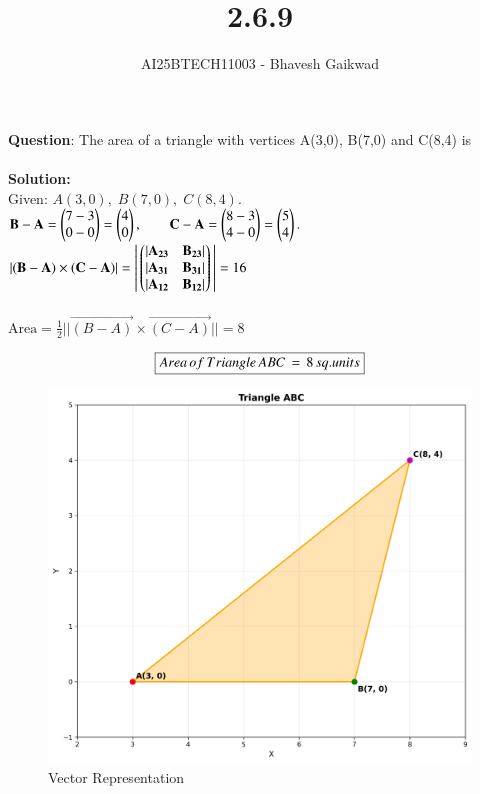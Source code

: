 \documentclass[journal]{IEEEtran}
\begin{document}

\vspace{3cm}

\title{2.6.9}
\author{AI25BTECH11003 - Bhavesh Gaikwad}
{\let\newpage\relax\maketitle}

\renewcommand{\thefigure}{\theenumi}
\renewcommand{\thetable}{\theenumi}
\setlength{\intextsep}{10pt} 


\renewcommand{\thetable}{\theenumi}


\textbf{Question}: The area of a triangle with vertices A(3,0), B(7,0) and C(8,4) is\\\\

\textbf{Solution:}\\
Given: $A(3,0),\; B(7,0),\; C(8,4).$\\

$
\mathbf{B}-\mathbf{A}=\begin{pmatrix}7-3\\0-0\end{pmatrix}
=\begin{pmatrix}4\\0\end{pmatrix},\qquad
\mathbf{C}-\mathbf{A}=\begin{pmatrix}8-3\\4-0\end{pmatrix} = \begin{pmatrix}5\\4\end{pmatrix}.
$\\

$|\mathbf{(B-A)} \times \mathbf{(C-A)}| = \left|\,\begin{pmatrix}|\mathbf{A_{23}} & \mathbf{B_{23}}| \\ |\mathbf{A_{31}} & \mathbf{B_{31}}| \\ |\mathbf{A_{12}} & \mathbf{B_{12}}|\end{pmatrix}\,\right| = 16 $\\\\


$
\text{Area}=\frac{1}{2}||\vec{(B-A)} \times \vec{(C-A)}|| = 8
$

\begin{align}
    \centering
    \boxed{Area \, of \, Triangle \, ABC \,= \,8\,sq.units}
\end{align}
\bigskip

\begin{figure}[htbp]
    \centering
    \includegraphics[width=0.65\linewidth]{figs/fig1.png}
    \caption{Vector Representation}
    \label{fig:fig/fig1.png}
\end{figure}
\end{document}
